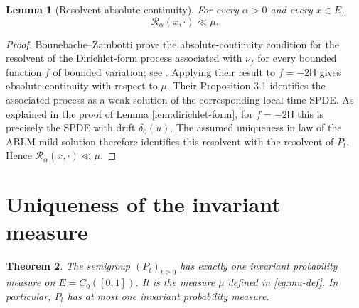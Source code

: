 \documentclass[11pt]{article}
\numberwithin{equation}{section}
\newtheorem{theorem}{Theorem}[section]
\newtheorem{lemma}[theorem]{Lemma}
\newcommand{\1}{\mathbf 1}
\begin{document}
\begin{lemma}[Resolvent absolute continuity]\label{lem:resolvent-ac}
For every $\alpha>0$ and every $x\in E$,
\[
        \mathcal R_\alpha(x,\cdot)\ll \mu.
\]
\end{lemma}

\begin{proof}
Bounebache--Zambotti prove the absolute-continuity condition for the resolvent of
the Dirichlet-form process associated with $\nu_f$ for every bounded function
$f$ of bounded variation; see \cite[Proposition 2.5]{BZ14}. Applying their result
to $f=-2\mathsf H$ gives absolute continuity with respect to $\mu$. Their
Proposition 3.1 identifies the associated process as a weak solution of the
corresponding local-time SPDE. As explained in the proof of Lemma
\ref{lem:dirichlet-form}, for $f=-2\mathsf H$ this is precisely the SPDE with drift
$\delta_0(u)$. The assumed uniqueness in law of the ABLM mild solution therefore
identifies this resolvent with the resolvent of $P_t$. Hence
$\mathcal R_\alpha(x,\cdot)\ll\mu$.
\end{proof}

\section{Uniqueness of the invariant measure}

\begin{theorem}\label{thm:unique-invariant}
The semigroup $(P_t)_{t\geq0}$ has exactly one invariant probability measure on
$E=C_0([0,1])$. It is the measure $\mu$ defined in \eqref{eq:mu-def}. In particular,
$P_t$ has at most one invariant probability measure.
\end{theorem}
\end{document}
